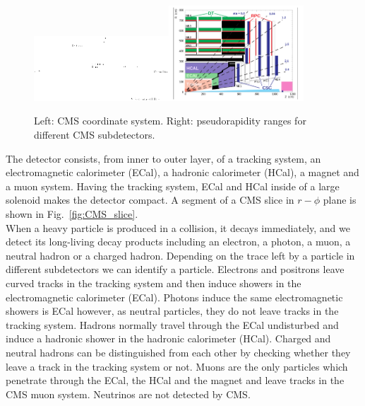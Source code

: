 \begin{figure}[htb]
  \begin{center}
    {\includegraphics[width=0.45\textwidth]{../figs/Exp/CMScoord.png}\includegraphics[width=0.45\textwidth]{../figs/Exp/CMScoord_eta.png}}
    \caption{Left: CMS coordinate system. Right: pseudorapidity ranges for different CMS subdetectors.}
    \label{fig:CMScoord}
  \end{center}
\end{figure}

The detector consists, from inner to outer layer,  of a tracking system, an electromagnetic calorimeter (ECal), a hadronic calorimeter (HCal), a magnet and a muon system. Having the tracking system, ECal and HCal inside of a large solenoid makes the detector compact. A segment of a CMS slice in $r-\phi$ plane is shown in Fig.~\ref{fig:CMS_slice}.\\

When a heavy particle is produced in a collision, it decays immediately, and we detect its long-living decay products including an electron, a photon, a muon, a neutral hadron or a charged hadron. Depending on the trace left by a particle in different subdetectors we can identify a particle. Electrons and positrons leave curved tracks in the tracking system and then induce showers in the electromagnetic calorimeter (ECal). Photons induce the same electromagnetic showers is ECal however, as neutral particles, they do not leave tracks in the tracking system. Hadrons normally travel through the ECal undisturbed and induce a hadronic shower in the hadronic calorimeter (HCal). Charged and neutral hadrons can be distinguished from each other by checking whether they leave a track in the tracking system or not. Muons are the only particles which penetrate through the ECal, the HCal and the magnet and leave tracks in the CMS muon system. Neutrinos are not detected by CMS. \\  

